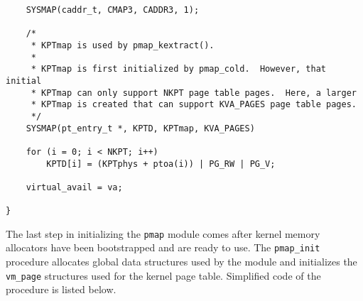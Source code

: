 \documentclass[shortabstract, english]{iithesis}
\newenvironment{code}{}{}
\begin{document}
\begin{code}
\begin{verbatim}
    SYSMAP(caddr_t, CMAP3, CADDR3, 1);

    /*
     * KPTmap is used by pmap_kextract().
     *
     * KPTmap is first initialized by pmap_cold.  However, that initial
     * KPTmap can only support NKPT page table pages.  Here, a larger
     * KPTmap is created that can support KVA_PAGES page table pages.
     */
    SYSMAP(pt_entry_t *, KPTD, KPTmap, KVA_PAGES)

    for (i = 0; i < NKPT; i++)
        KPTD[i] = (KPTphys + ptoa(i)) | PG_RW | PG_V;

    virtual_avail = va;

}
\end{verbatim}
\end{code}


The last step in initializing the \texttt{pmap} module comes after kernel memory
allocators have been bootstrapped and are ready to use. The
\texttt{pmap_init} procedure allocates global data structures used by the
module and initializes the \texttt{vm_page} structures used for the
kernel page table. Simplified code of the procedure is listed below.
\end{document}
